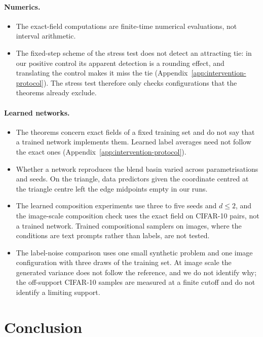 \documentclass{article} %
\theoremstyle{plain}
\theoremstyle{definition}
\theoremstyle{remark}
\begin{document}
\paragraph{Numerics.}
\begin{itemize}[leftmargin=1.5em,itemsep=1pt,topsep=2pt]
\item The exact-field computations are finite-time numerical evaluations, not interval arithmetic.
\item The fixed-step scheme of the stress test does not detect an attracting tie: in our positive
  control its apparent detection is a rounding effect, and translating the control makes it miss
  the tie (Appendix~\ref{app:intervention-protocol}). The stress test therefore only checks
  configurations that the theorems already exclude.
\end{itemize}

\paragraph{Learned networks.}
\begin{itemize}[leftmargin=1.5em,itemsep=1pt,topsep=2pt]
\item The theorems concern exact fields of a fixed training set and do not say that a trained
  network implements them. Learned label averages need not follow the exact ones
  (Appendix~\ref{app:intervention-protocol}).
\item Whether a network reproduces the blend basin varied across parametrisations and seeds. On
  the triangle, data predictors given the coordinate centred at the triangle centre left the edge
  midpoints empty in our runs.
\item The learned composition experiments use three to five seeds and $d\le2$, and the image-scale
  composition check uses the exact field on CIFAR-10 pairs, not a trained network. Trained
  compositional samplers on images, where the conditions are text prompts rather than labels, are
  not tested.
\item The label-noise comparison uses one small synthetic problem and one image configuration with
  three draws of the training set. At image scale the generated variance does not follow the
  reference, and we do not identify why; the off-support CIFAR-10 samples are measured at a finite
  cutoff and do not identify a limiting support.
\end{itemize}

\section{Conclusion}
\label{sec:conclusion}
\end{document}
